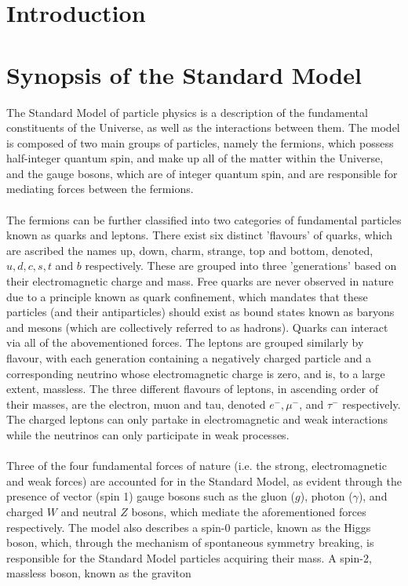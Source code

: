 \section{Introduction}
\section{Synopsis of the Standard Model}
The Standard Model of particle physics is a description of the fundamental constituents of the Universe, as well as the interactions between them.
The model is composed of two main groups of particles, namely the fermions, which possess half-integer quantum spin, and make up all of the 
matter within the Universe, and the gauge bosons, which are of integer quantum spin, and are responsible for mediating forces between the fermions.\\
\\
The fermions can be further classified into two categories of fundamental particles known as quarks and leptons. There exist six distinct 'flavours' of quarks, which are
ascribed the names up, down, charm, strange, top and bottom, denoted, $u, d, c, s, t$ and $b$ respectively. These are grouped into three 'generations' based on their electromagnetic charge
and mass. Free quarks are never observed in nature due to a principle known as quark confinement, which mandates that these particles (and their antiparticles) should exist as bound states known as baryons and mesons
(which are collectively referred to as hadrons). Quarks can interact via all of the abovementioned forces. The leptons are grouped similarly by flavour, with each generation containing a negatively charged particle and a corresponding neutrino
whose electromagnetic charge is zero, and is, to a large extent, massless. The three different flavours of leptons, in ascending order of their masses, are the electron, muon and tau, denoted $e^{-}, \mu^{-}$, and $\tau^{-}$ respectively. The charged leptons
can only partake in electromagnetic and weak interactions while the neutrinos can only participate in weak processes.\\
\\
Three of the four fundamental forces of nature (i.e. the strong, electromagnetic and weak forces) are accounted for in the Standard Model, as evident through the presence of vector (spin 1) gauge bosons such as the gluon ($g$), photon ($\gamma$), and charged $W$ and neutral $Z$ bosons, 
which mediate the aforementioned forces respectively. The model also describes a spin-0 particle, known as the Higgs boson, which, through the mechanism of spontaneous symmetry breaking, is responsible for the Standard Model particles acquiring their mass. A spin-2, massless boson, known as the graviton
